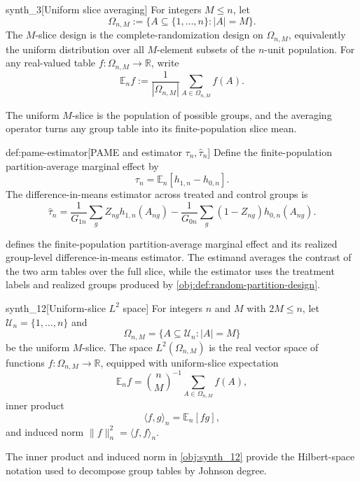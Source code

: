 \documentclass[11pt]{article}
\begin{document}
\begin{definitionv}{synth_3}[Uniform slice averaging]
For integers \(M\le n\), let
\[
\Omega_{n,M}:=\{A\subseteq\{1,\ldots,n\}: |A|=M\}.
\]
The \(M\)-slice design is the complete-randomization design on \(\Omega_{n,M}\), equivalently the uniform distribution over all \(M\)-element subsets of the \(n\)-unit population. For any real-valued table \(f:\Omega_{n,M}\to\mathbb R\), write
\[
\mathbb E_n f
:=
\frac{1}{|\Omega_{n,M}|}\sum_{A\in\Omega_{n,M}} f(A).
\]
\end{definitionv}

The uniform \(M\)-slice  is the population of possible groups, and the averaging operator  turns any group table into its finite-population slice mean.

\begin{definitionv}{def:pame-estimator}[PAME and estimator \(\tau_n,\widehat\tau_n\)]
Define the finite-population partition-average marginal effect by
\[
\tau_n=\mathbb E_n\!\left[h_{1,n}-h_{0,n}\right].
\]
The difference-in-means estimator across treated and control groups is
\[
\widehat\tau_n
=
\frac{1}{G_{1n}}\sum_g Z_{ng}h_{1,n}(A_{ng})
-
\frac{1}{G_{0n}}\sum_g (1-Z_{ng})h_{0,n}(A_{ng}).
\]
\end{definitionv}

 defines the finite-population partition-average marginal effect and its realized group-level difference-in-means estimator. The estimand averages the contrast of the two arm tables over the full slice, while the estimator uses the treatment labels and realized groups produced by \cref{obj:def:random-partition-design}.

\begin{definitionv}{synth_12}[Uniform-slice \(L^2\) space]
For integers \(n\) and \(M\) with \(2M\le n\), let \(\mathcal U_n=\{1,\ldots,n\}\) and
\[
\Omega_{n,M}=\{A\subseteq\mathcal U_n: |A|=M\}
\]
be the uniform \(M\)-slice. The space \(L^2(\Omega_{n,M})\) is the real vector space of functions \(f:\Omega_{n,M}\to\mathbb R\), equipped with uniform-slice expectation
\[
\mathbb E_n f=\binom nM^{-1}\sum_{A\in\Omega_{n,M}} f(A),
\]
inner product
\[
\langle f,g\rangle_n=\mathbb E_n[fg],
\]
and induced norm \(\|f\|_n^2=\langle f,f\rangle_n\).
\end{definitionv}

The inner product  and induced norm  in \cref{obj:synth_12} provide the Hilbert-space notation used to decompose group tables by Johnson degree.
\end{document}
